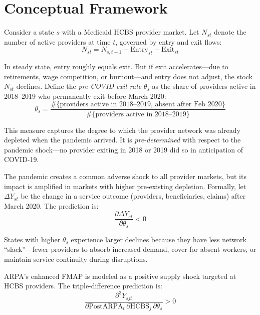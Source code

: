\documentclass[12pt]{article}
\begin{document}
\section{Conceptual Framework}

Consider a state $s$ with a Medicaid HCBS provider market. Let $N_{st}$ denote the number of active providers at time $t$, governed by entry and exit flows:
\begin{equation}
N_{st} = N_{s,t-1} + \text{Entry}_{st} - \text{Exit}_{st}
\end{equation}

In steady state, entry roughly equals exit. But if exit accelerates---due to retirements, wage competition, or burnout---and entry does not adjust, the stock $N_{st}$ declines. Define the \emph{pre-COVID exit rate} $\theta_s$ as the share of providers active in 2018--2019 who permanently exit before March 2020:
\begin{equation}
\theta_s = \frac{\#\{\text{providers active in 2018--2019, absent after Feb 2020}\}}{\#\{\text{providers active in 2018--2019}\}}
\end{equation}

This measure captures the degree to which the provider network was already depleted when the pandemic arrived. It is \emph{pre-determined} with respect to the pandemic shock---no provider exiting in 2018 or 2019 did so in anticipation of COVID-19.

The pandemic creates a common adverse shock to all provider markets, but its impact is amplified in markets with higher pre-existing depletion. Formally, let $\Delta Y_{st}$ be the change in a service outcome (providers, beneficiaries, claims) after March 2020. The prediction is:
\begin{equation}
\frac{\partial \Delta Y_{st}}{\partial \theta_s} < 0
\end{equation}

States with higher $\theta_s$ experience larger declines because they have less network ``slack''---fewer providers to absorb increased demand, cover for absent workers, or maintain service continuity during disruptions.

ARPA's enhanced FMAP is modeled as a positive supply shock targeted at HCBS providers. The triple-difference prediction is:
\begin{equation}
\frac{\partial^3 Y_{sjt}}{\partial \text{PostARPA}_t \, \partial \text{HCBS}_j \, \partial \theta_s} > 0
\end{equation}
\end{document}
